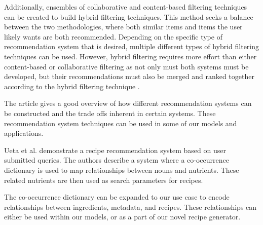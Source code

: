 \documentclass[sigconf]{acmart}
\begin{document}
Additionally, ensembles of collaborative and content-based filtering techniques can be created to build hybrid filtering techniques. This method seeks a balance between the two methodologies, where both similar items and items the user likely wants are both recommended. Depending on the specific type of recommendation system that is desired, multiple different types of hybrid filtering techniques can be used. However, hybrid filtering requires more effort than either content-based or collaborative filtering as not only must both systems must be developed, but their recommendations must also be merged and ranked together according to the hybrid filtering technique \cite{RSSurvey}.

The article gives a good overview of how different recommendation systems can be constructed and the trade offs inherent in certain systems. These recommendation system techniques can be used in some of our models and applications.

Ueta et al. \cite{RSRecipe} demonstrate a recipe recommendation system based on user submitted queries. The authors describe a system where a co-occurrence dictionary is used to map relationships between nouns and nutrients. These related nutrients are then used as search parameters for recipes.

The co-occurrence dictionary can be expanded to our use case to encode relationships between ingredients, metadata, and recipes. These relationships can either be used within our models, or as a part of our novel recipe generator.
\end{document}
